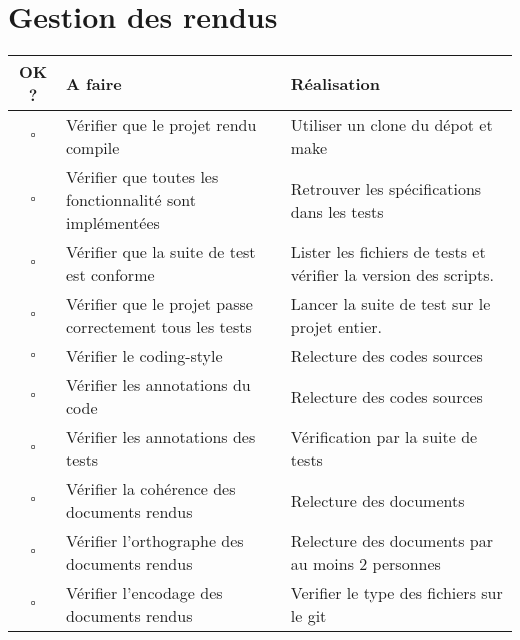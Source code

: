 \documentclass[11pt]{article}
\begin{document}
\section{Gestion des rendus}
\begin{tabular}{|c|p{7cm}|p{7cm}|}
\hline
OK ? & A faire & Réalisation \\
\hline
\hline

$\square$ & Vérifier que le projet rendu compile & Utiliser un clone du dépot et make \\
\hline
$\square$ & Vérifier que toutes les fonctionnalité sont implémentées & Retrouver les spécifications dans les tests \\
\hline
$\square$ & Vérifier que la suite de test est conforme & Lister les fichiers de tests et vérifier la version des scripts. \\
\hline
$\square$ & Vérifier que le projet passe correctement tous les tests & Lancer la suite de test sur le projet entier. \\
\hline
$\square$ & Vérifier le coding-style & Relecture des codes sources\\
\hline
$\square$ & Vérifier les annotations du code & Relecture des codes sources \\
\hline 
$\square$ & Vérifier les annotations des tests & Vérification par la suite de tests\\
\hline
$\square$ & Vérifier la cohérence des documents rendus & Relecture des documents\\
\hline
$\square$ & Vérifier l'orthographe des documents rendus & Relecture des documents par au moins 2 personnes\\
\hline
$\square$ & Vérifier l'encodage des documents rendus & Verifier le type des fichiers sur le git\\
\hline
\end{tabular}
\end{document}
